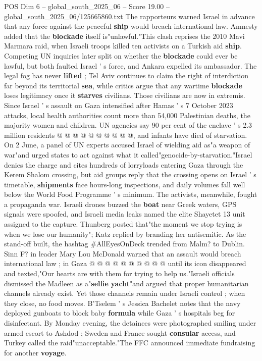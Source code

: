 \begin{textsample}{POS Dim 6 – global\_south\_2025\_06 – Score 19.00 – global\_south\_2025\_06/125665860.txt}
The rapporteurs warned Israel in advance that any force against the peaceful \textbf{ship} would breach international law.
Amnesty added that the \textbf{blockade} itself is"unlawful."This clash reprises the 2010 Mavi Marmara raid, when Israeli troops killed ten activists on a Turkish aid \textbf{ship}.
Competing UN inquiries later split on whether the \textbf{blockade} could ever be lawful, but both faulted Israel ' s force, and Ankara expelled its ambassador.
The legal fog has never \textbf{lifted} ; Tel Aviv continues to claim the right of interdiction far beyond its territorial \textbf{sea}, while critics argue that any wartime \textbf{blockade} loses legitimacy once it \textbf{starves} civilians.
Those civilians are now in extremis.
Since Israel ' s assault on Gaza intensified after Hamas ' s 7 October 2023 attacks, local health authorities count more than 54,000 Palestinian deaths, the majority women and children.
UN agencies say 90 per cent of the enclave ' s 2.3 million residents @ @ @ @ @ @ @ @ @ @, and infants have died of starvation.
On 2 June, a panel of UN experts accused Israel of wielding aid as"a weapon of war"and urged states to act against what it called"genocide-by-starvation."Israel denies the charge and cites hundreds of lorryloads entering Gaza through the Kerem Shalom crossing, but aid groups reply that the crossing opens on Israel ' s timetable, \textbf{shipments} face hours-long inspections, and daily volumes fall well below the World Food Programme ' s minimum.
The activists, meanwhile, fought a propaganda war.
Israeli drones buzzed the \textbf{boat} near Greek waters, GPS signals were spoofed, and Israeli media leaks named the elite Shayetet 13 unit assigned to the capture.
Thunberg posted that"the moment we stop trying is when we lose our humanity"; Katz replied by branding her antisemitic.
As the stand-off built, the hashtag \#AllEyesOnDeck trended from Malm? to Dublin.
Sinn F? in leader Mary Lou McDonald warned that an assault would breach international law ; in Gaza @ @ @ @ @ @ @ @ @ @ until its icon disappeared and texted,"Our hearts are with them for trying to help us."Israeli officials dismissed the Madleen as a"\textbf{selfie} \textbf{yacht}"and argued that proper humanitarian channels already exist.
Yet those channels remain under Israeli control ; when they close, no food moves.
B'Tselem ' s Jessica Bachelet notes that the navy deployed gunboats to block baby \textbf{formula} while Gaza ' s hospitals beg for disinfectant.
By Monday evening, the detainees were photographed smiling under armed escort to Ashdod ; Sweden and France sought \textbf{consular} access, and Turkey called the raid"unacceptable."The FFC announced immediate fundraising for another \textbf{voyage}.

\end{textsample}
